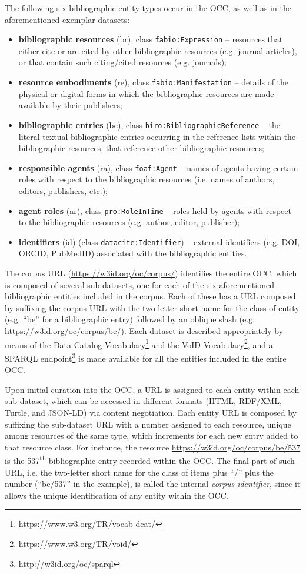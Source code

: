 \documentclass[runningheads,a4paper]{llncs}
\begin{document}
The following six bibliographic entity types occur in the OCC, as well as in the aforementioned exemplar datasets:
\begin{itemize}
\item {\bf bibliographic resources} (br), class \Verb+fabio:Expression+ -- resources that either cite or are cited by other bibliographic resources (e.g. journal articles), or that contain such citing/cited resources (e.g. journals);
\item {\bf resource embodiments} (re), class \Verb+fabio:Manifestation+ -- details of the physical or digital forms in which the bibliographic resources are made available by their publishers;
\item {\bf bibliographic entries} (be), class \Verb+biro:BibliographicReference+ -- the literal textual bibliographic entries occurring in the reference lists within the bibliographic resources, that reference other bibliographic resources;
\item {\bf responsible agents} (ra), class \Verb+foaf:Agent+ -- names of agents having certain roles with respect to the bibliographic resources (i.e. names of authors, editors, publishers, etc.);
\item {\bf agent roles} (ar), class \Verb+pro:RoleInTime+ -- roles held by agents with respect to the bibliographic resources (e.g. author, editor, publisher);
\item {\bf identifiers} (id) (class \Verb+datacite:Identifier+) -- external identifiers (e.g. DOI, ORCID, PubMedID) associated with the bibliographic entities.
\end{itemize}

The corpus URL (\url{https://w3id.org/oc/corpus/}) identifies the entire OCC, which is composed of several sub-datasets, one for each of the six aforementioned bibliographic entities included in the corpus. Each of these has a URL composed by suffixing the corpus URL with the two-letter short name for the class of entity (e.g. ``be'' for a bibliographic entry) followed by an oblique slash (e.g. \url{https://w3id.org/oc/corpus/be/}). Each dataset is described appropriately by means of the Data Catalog Vocabulary\footnote{\url{https://www.w3.org/TR/vocab-dcat/}} and the VoID Vocabulary\footnote{\url{https://www.w3.org/TR/void/}}, and a SPARQL endpoint\footnote{\url{http://w3id.org/oc/sparql}} is made available for all the entities included in the entire OCC.

Upon initial curation into the OCC, a URL is assigned to each entity within each sub-dataset, which can be accessed in different formats (HTML, RDF/XML, Turtle, and JSON-LD) via content negotiation. Each entity URL is composed by suffixing the sub-dataset URL with a number assigned to each resource, unique among resources of the same type, which increments for each new entry added to that resource class. For instance, the resource \url{https://w3id.org/oc/corpus/be/537} is the 537\textsuperscript{th} bibliographic entry recorded within the OCC. The final part of such URL, i.e. the two-letter short name for the class of items plus ``/'' plus the number (``be/537'' in the example), is called the internal {\em corpus identifier}, since it allows the unique identification of any entity within the OCC.
\end{document}
